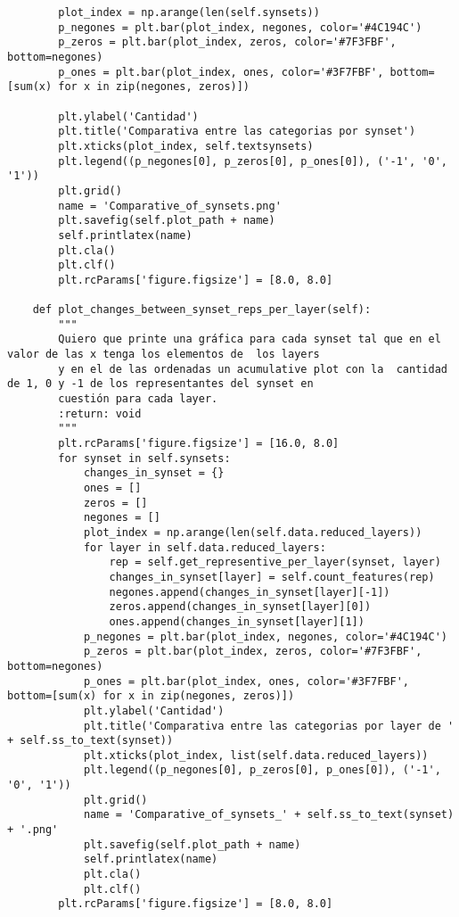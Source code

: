\documentclass[12,twoside]{TFG-GM}
\theoremstyle{definition}
\theoremstyle{remark}
\begin{document}
\begin{verbatim}
        plot_index = np.arange(len(self.synsets))
        p_negones = plt.bar(plot_index, negones, color='#4C194C')
        p_zeros = plt.bar(plot_index, zeros, color='#7F3FBF', bottom=negones)
        p_ones = plt.bar(plot_index, ones, color='#3F7FBF', bottom=[sum(x) for x in zip(negones, zeros)])

        plt.ylabel('Cantidad')
        plt.title('Comparativa entre las categorias por synset')
        plt.xticks(plot_index, self.textsynsets)
        plt.legend((p_negones[0], p_zeros[0], p_ones[0]), ('-1', '0', '1'))
        plt.grid()
        name = 'Comparative_of_synsets.png'
        plt.savefig(self.plot_path + name)
        self.printlatex(name)
        plt.cla()
        plt.clf()
        plt.rcParams['figure.figsize'] = [8.0, 8.0]

    def plot_changes_between_synset_reps_per_layer(self):
        """
        Quiero que printe una gráfica para cada synset tal que en el valor de las x tenga los elementos de  los layers
        y en el de las ordenadas un acumulative plot con la  cantidad de 1, 0 y -1 de los representantes del synset en
        cuestión para cada layer.
        :return: void
        """
        plt.rcParams['figure.figsize'] = [16.0, 8.0]
        for synset in self.synsets:
            changes_in_synset = {}
            ones = []
            zeros = []
            negones = []
            plot_index = np.arange(len(self.data.reduced_layers))
            for layer in self.data.reduced_layers:
                rep = self.get_representive_per_layer(synset, layer)
                changes_in_synset[layer] = self.count_features(rep)
                negones.append(changes_in_synset[layer][-1])
                zeros.append(changes_in_synset[layer][0])
                ones.append(changes_in_synset[layer][1])
            p_negones = plt.bar(plot_index, negones, color='#4C194C')
            p_zeros = plt.bar(plot_index, zeros, color='#7F3FBF', bottom=negones)
            p_ones = plt.bar(plot_index, ones, color='#3F7FBF', bottom=[sum(x) for x in zip(negones, zeros)])
            plt.ylabel('Cantidad')
            plt.title('Comparativa entre las categorias por layer de ' + self.ss_to_text(synset))
            plt.xticks(plot_index, list(self.data.reduced_layers))
            plt.legend((p_negones[0], p_zeros[0], p_ones[0]), ('-1', '0', '1'))
            plt.grid()
            name = 'Comparative_of_synsets_' + self.ss_to_text(synset) + '.png'
            plt.savefig(self.plot_path + name)
            self.printlatex(name)
            plt.cla()
            plt.clf()
        plt.rcParams['figure.figsize'] = [8.0, 8.0]


\end{verbatim}
\end{document}
